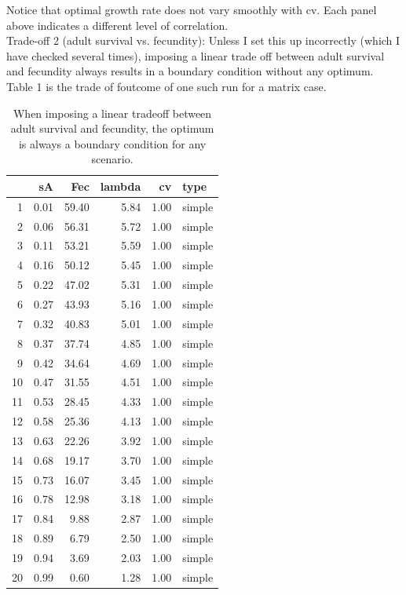 \documentclass{article}\usepackage{graphicx, color}
\begin{document}
Notice that optimal growth rate does not vary smoothly with cv. Each panel above indicates a different level of correlation.\\

Trade-off 2 (adult survival vs. fecundity): Unless I set this up incorrectly (which I have checked several times), imposing a linear trade off between adult survival and fecundity always results in a boundary condition without any optimum. Table 1 is the trade of foutcome of one such run for a matrix case. \\


\begin{table}[ht]
\begin{center}
\begin{tabular}{rrrrrl}
  \hline
 & sA & Fec & lambda & cv & type \\ 
  \hline
1 & 0.01 & 59.40 & 5.84 & 1.00 & simple \\ 
  2 & 0.06 & 56.31 & 5.72 & 1.00 & simple \\ 
  3 & 0.11 & 53.21 & 5.59 & 1.00 & simple \\ 
  4 & 0.16 & 50.12 & 5.45 & 1.00 & simple \\ 
  5 & 0.22 & 47.02 & 5.31 & 1.00 & simple \\ 
  6 & 0.27 & 43.93 & 5.16 & 1.00 & simple \\ 
  7 & 0.32 & 40.83 & 5.01 & 1.00 & simple \\ 
  8 & 0.37 & 37.74 & 4.85 & 1.00 & simple \\ 
  9 & 0.42 & 34.64 & 4.69 & 1.00 & simple \\ 
  10 & 0.47 & 31.55 & 4.51 & 1.00 & simple \\ 
  11 & 0.53 & 28.45 & 4.33 & 1.00 & simple \\ 
  12 & 0.58 & 25.36 & 4.13 & 1.00 & simple \\ 
  13 & 0.63 & 22.26 & 3.92 & 1.00 & simple \\ 
  14 & 0.68 & 19.17 & 3.70 & 1.00 & simple \\ 
  15 & 0.73 & 16.07 & 3.45 & 1.00 & simple \\ 
  16 & 0.78 & 12.98 & 3.18 & 1.00 & simple \\ 
  17 & 0.84 & 9.88 & 2.87 & 1.00 & simple \\ 
  18 & 0.89 & 6.79 & 2.50 & 1.00 & simple \\ 
  19 & 0.94 & 3.69 & 2.03 & 1.00 & simple \\ 
  20 & 0.99 & 0.60 & 1.28 & 1.00 & simple \\ 
   \hline
\end{tabular}
\caption{When imposing a linear tradeoff between adult survival and fecundity, the optimum is always a boundary condition for any scenario.}
\end{center}
\end{table}
\end{document}
